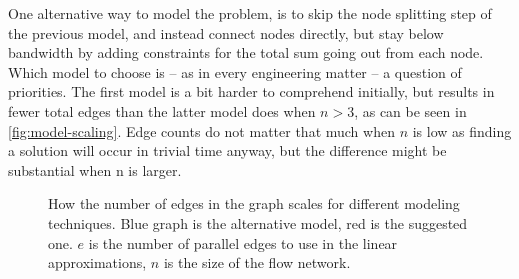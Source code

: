 One alternative way to model the problem, is to skip the node splitting step of the previous model, and instead connect nodes directly, but stay below bandwidth by adding constraints for the total sum going out from each node. Which model to choose is -- as in every engineering matter -- a question of priorities. The first model is a bit harder to comprehend initially, but results in fewer total edges than the latter model does when $n>3$, as can be seen in \autoref{fig:model-scaling}. Edge counts do not matter that much when $n$ is low as finding a solution will occur in trivial time anyway, but the difference might be substantial when n is larger. 

\begin{figure}
    \centering
    \caption{How the number of edges in the graph scales for different modeling techniques. Blue graph is the alternative model, red is the suggested one. $e$ is the number of parallel edges to use in the linear approximations, $n$ is the size of the flow network.}
    \label{fig:model-scaling}
\end{figure}



